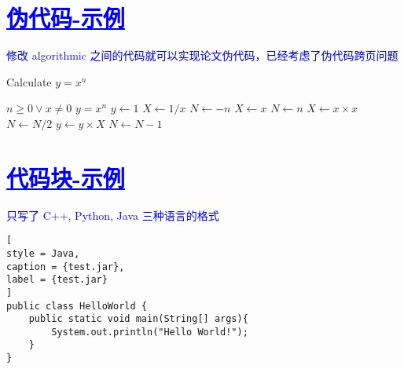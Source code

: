 
\section{\textcolor{blue}{\underline{\underline{伪代码-示例}}}}

\textcolor{blue}{修改 algorithmic 之间的代码就可以实现论文伪代码，已经考虑了伪代码跨页问题}
\begin{breakablealgorithm}
        \caption{Calculate $y = x^n$}
        \begin{algorithmic}[1] %
            \Require $n \geq 0 \vee x \neq 0$ 
            \Ensure  $y = x^n$
            \State $y \gets 1$
            \State $ X \gets 1 / x$
            \State $N \gets -n$
            \Else
            \State $X \gets x$
            \State $N \gets n$
            \EndIf
            \State $X \gets x \times x$
            \State $N \gets N / 2$
            \Else[$N$ is odd]
            \State $y \gets y \times X$
            \State $N \gets N - 1$
            \EndIf
            \EndWhile
     \end{algorithmic}
    \end{breakablealgorithm}

\section{\textcolor{blue}{\underline{\underline{代码块-示例}}}}
\textcolor{blue}{只写了 C++, Python, Java 三种语言的格式}



\begin{lstlisting}[
style = Java,
caption = {test.jar},
label = {test.jar}
]
public class HelloWorld {
    public static void main(String[] args){
        System.out.println("Hello World!");
    }
}
\end{lstlisting}


